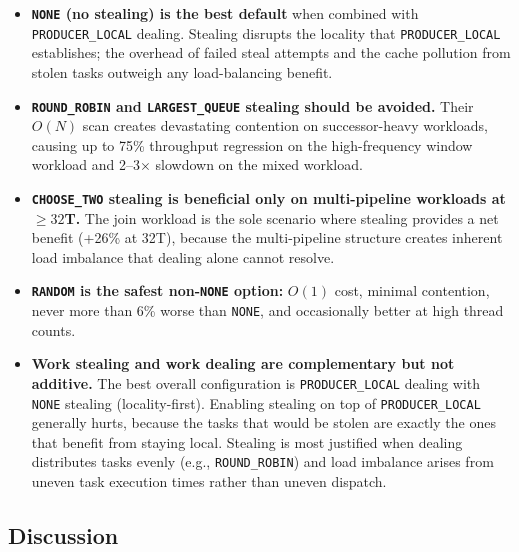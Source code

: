 \begin{itemize}
    \item \textbf{\texttt{NONE} (no stealing) is the best default} when combined with \texttt{PRODUCER\_LOCAL} dealing.
    Stealing disrupts the locality that \texttt{PRODUCER\_LOCAL} establishes; the overhead of failed steal attempts and the cache pollution from stolen tasks outweigh any load-balancing benefit.

    \item \textbf{\texttt{ROUND\_ROBIN} and \texttt{LARGEST\_QUEUE} stealing should be avoided.}
    Their $O(N)$ scan creates devastating contention on successor-heavy workloads, causing up to 75\% throughput regression on the high-frequency window workload and 2--3$\times$ slowdown on the mixed workload.

    \item \textbf{\texttt{CHOOSE\_TWO} stealing is beneficial only on multi-pipeline workloads at $\geq 32$T.}
    The join workload is the sole scenario where stealing provides a net benefit (+26\% at 32T), because the multi-pipeline structure creates inherent load imbalance that dealing alone cannot resolve.

    \item \textbf{\texttt{RANDOM} is the safest non-\texttt{NONE} option:} $O(1)$ cost, minimal contention, never more than 6\% worse than \texttt{NONE}, and occasionally better at high thread counts.

    \item \textbf{Work stealing and work dealing are complementary but not additive.}
    The best overall configuration is \texttt{PRODUCER\_LOCAL} dealing with \texttt{NONE} stealing (locality-first).
    Enabling stealing on top of \texttt{PRODUCER\_LOCAL} generally hurts, because the tasks that would be stolen are exactly the ones that benefit from staying local.
    Stealing is most justified when dealing distributes tasks evenly (e.g., \texttt{ROUND\_ROBIN}) and load imbalance arises from uneven task execution times rather than uneven dispatch.
\end{itemize}

\subsection{Discussion}
